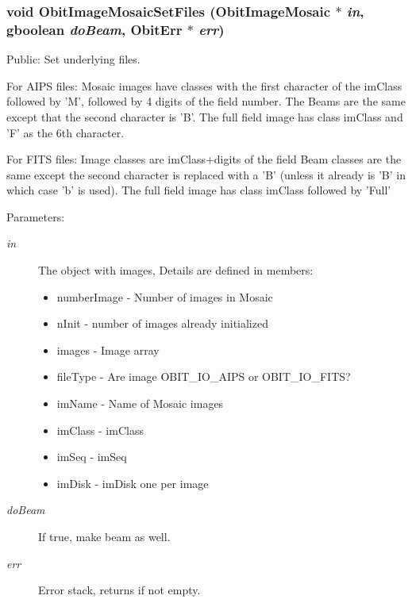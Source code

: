 \subsubsection{\setlength{\rightskip}{0pt plus 5cm}void Obit\-Image\-Mosaic\-Set\-Files ({\bf Obit\-Image\-Mosaic} $\ast$ {\em in}, gboolean {\em do\-Beam}, {\bf Obit\-Err} $\ast$ {\em err})}\label{ObitImageMosaic_8c_a21}


Public: Set underlying files. 

For AIPS files: Mosaic images have classes with the first character of the im\-Class followed by 'M', followed by 4 digits of the field number. The Beams are the same except that the second character is 'B'. The full field image has class im\-Class and 'F' as the 6th character.

For FITS files: Image classes are im\-Class+digits of the field Beam classes are the same except the second character is replaced with a 'B' (unless it already is 'B' in which case 'b' is used). The full field image has class im\-Class followed by 'Full'

\begin{Desc}
\item[Parameters:]
\begin{description}
\item[{\em in}]The object with images, Details are defined in members: \begin{itemize}
\item number\-Image - Number of images in Mosaic \item n\-Init - number of images already initialized \item images - Image array \item file\-Type - Are image OBIT\_\-IO\_\-AIPS or OBIT\_\-IO\_\-FITS? \item im\-Name - Name of Mosaic images \item im\-Class - im\-Class \item im\-Seq - im\-Seq \item im\-Disk - im\-Disk one per image \end{itemize}
\item[{\em do\-Beam}]If true, make beam as well. \item[{\em err}]Error stack, returns if not empty. \end{description}
\end{Desc}

